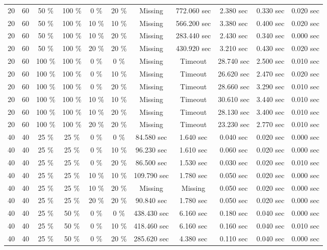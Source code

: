 \documentclass{article}
\begin{document}
\begin{longtable}[]{@{}ccccccccccc@{}}
20 & 60 & 50 \% & 100 \% & 0 \% & 20 \% & Missing & 772.060 sec & 2.380 sec & 0.330 sec & 0.020 sec \\
20 & 60 & 50 \% & 100 \% & 10 \% & 10 \% & Missing & 566.200 sec & 3.380 sec & 0.400 sec & 0.020 sec \\
20 & 60 & 50 \% & 100 \% & 10 \% & 20 \% & Missing & 283.440 sec & 2.430 sec & 0.340 sec & 0.000 sec \\
20 & 60 & 50 \% & 100 \% & 20 \% & 20 \% & Missing & 430.920 sec & 3.210 sec & 0.430 sec & 0.020 sec \\
20 & 60 & 100 \% & 100 \% & 0 \% & 0 \% & Missing & Timeout & 28.740 sec & 2.500 sec & 0.010 sec \\
20 & 60 & 100 \% & 100 \% & 0 \% & 10 \% & Missing & Timeout & 26.620 sec & 2.470 sec & 0.020 sec \\
20 & 60 & 100 \% & 100 \% & 0 \% & 20 \% & Missing & Timeout & 28.660 sec & 3.290 sec & 0.010 sec \\
20 & 60 & 100 \% & 100 \% & 10 \% & 10 \% & Missing & Timeout & 30.610 sec & 3.440 sec & 0.010 sec \\
20 & 60 & 100 \% & 100 \% & 10 \% & 20 \% & Missing & Timeout & 28.130 sec & 3.400 sec & 0.010 sec \\
20 & 60 & 100 \% & 100 \% & 20 \% & 20 \% & Missing & Timeout & 23.230 sec & 2.770 sec & 0.010 sec \\
40 & 40 & 25 \% & 25 \% & 0 \% & 0 \% & 84.580 sec & 1.640 sec & 0.040 sec & 0.020 sec & 0.000 sec \\
40 & 40 & 25 \% & 25 \% & 0 \% & 10 \% & 96.230 sec & 1.610 sec & 0.060 sec & 0.020 sec & 0.000 sec \\
40 & 40 & 25 \% & 25 \% & 0 \% & 20 \% & 86.500 sec & 1.530 sec & 0.030 sec & 0.020 sec & 0.010 sec \\
40 & 40 & 25 \% & 25 \% & 10 \% & 10 \% & 109.790 sec & 1.780 sec & 0.050 sec & 0.020 sec & 0.000 sec \\
40 & 40 & 25 \% & 25 \% & 10 \% & 20 \% & Missing & Missing & 0.050 sec & 0.020 sec & 0.000 sec \\
40 & 40 & 25 \% & 25 \% & 20 \% & 20 \% & 90.840 sec & 1.780 sec & 0.050 sec & 0.020 sec & 0.000 sec \\
40 & 40 & 25 \% & 50 \% & 0 \% & 0 \% & 438.430 sec & 6.160 sec & 0.180 sec & 0.040 sec & 0.000 sec \\
40 & 40 & 25 \% & 50 \% & 0 \% & 10 \% & 418.460 sec & 6.160 sec & 0.160 sec & 0.040 sec & 0.010 sec \\
40 & 40 & 25 \% & 50 \% & 0 \% & 20 \% & 285.620 sec & 4.380 sec & 0.110 sec & 0.040 sec & 0.000 sec \\

\end{longtable}
\end{document}
